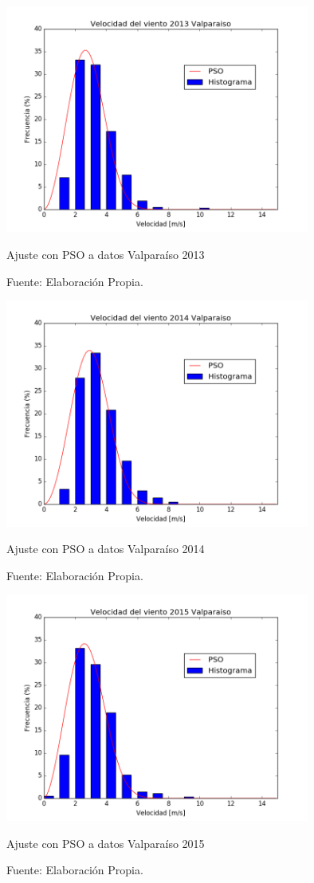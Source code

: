 \begin{figure}[h!]
    \centering
    \includegraphics[height=75mm]{figures/result_2013.png}
    \caption{Ajuste con PSO a datos Valparaíso 2013}
    \vspace{-.25cm}
    \caption*{Fuente: Elaboración Propia.}
    \label{fig:pso_valpo_13}
\end{figure}
\begin{figure}[h!]
    \centering
    \includegraphics[height=75mm]{figures/result_2014.png}
    \caption{Ajuste con PSO a datos Valparaíso 2014}
    \vspace{-.25cm}
    \caption*{Fuente: Elaboración Propia.}
    \label{fig:pso_valpo_14}
\end{figure}
\begin{figure}[h!]
    \centering
    \includegraphics[height=75mm]{figures/result_2015.png}
    \caption{Ajuste con PSO a datos Valparaíso 2015}
    \vspace{-.25cm}
    \caption*{Fuente: Elaboración Propia.}
    \label{fig:pso_valpo_15}
\end{figure}

